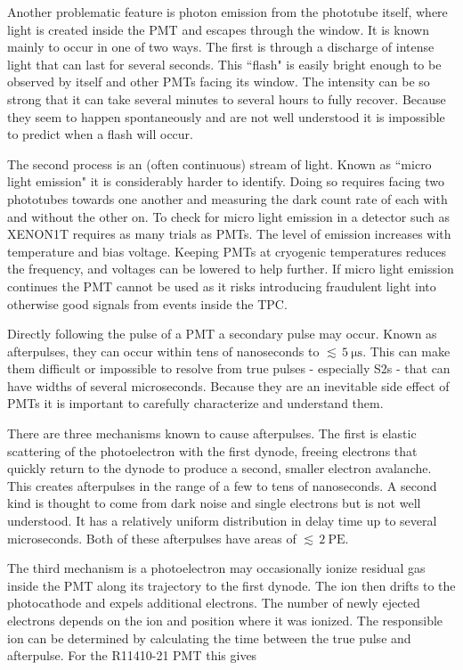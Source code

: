 Another problematic feature is photon emission from the phototube itself, where light is created inside the PMT and escapes through the
window.  It is known mainly to occur in one of two ways.  The first is through a discharge of intense light that can last for
several seconds.  This ``flash" is easily bright enough to be observed by itself and other PMTs facing its
window.  The intensity can be so strong that it can take several minutes to several hours to fully
recover.  Because they seem to happen spontaneously and are not well understood it is impossible to predict when a flash will occur.

The second process is an (often continuous) stream of light.  Known as ``micro light emission" it is considerably harder to
identify.  Doing so requires facing two phototubes towards one another and measuring the dark count rate of each with and without the
other on.  To check for micro light emission in a detector such as XENON1T requires as many trials as PMTs.  The level of emission
increases with temperature and bias voltage.  Keeping PMTs at cryogenic temperatures reduces
the frequency, and voltages can be lowered to help further.  If micro light emission continues the PMT cannot be used as it risks
introducing fraudulent light into otherwise good signals from events inside the TPC.

Directly following the pulse of a PMT a secondary pulse may occur.  Known as afterpulses, they can occur within tens of nanoseconds to
${\lesssim}\, 5\ \mathrm{\mu s}$.  This can make them difficult or impossible to resolve from true pulses - especially S2s - that can have
widths of several
microseconds.  Because they are an inevitable side effect of PMTs it is important to carefully characterize and understand them.

There are three mechanisms known to cause afterpulses.  The first is elastic scattering of the photoelectron with the first dynode,
freeing electrons that quickly return to the dynode to produce a second, smaller electron avalanche.  This
creates afterpulses in the range of a few to tens of nanoseconds.  A second kind is thought to come
from dark noise and single electrons but is not well understood.  It has a relatively uniform distribution in delay time up to several
microseconds.  Both of these afterpulses have areas of ${\lesssim}\, 2\ \mathrm{PE}$.

The third mechanism is a photoelectron may occasionally ionize residual gas inside the PMT along its trajectory to the first dynode.  The
ion then drifts to the photocathode and expels additional electrons.  The number of newly ejected electrons depends
on the ion and position where it was ionized.  The responsible ion can be determined by calculating the time between the true pulse and
afterpulse.  For the R11410-21 PMT this gives

